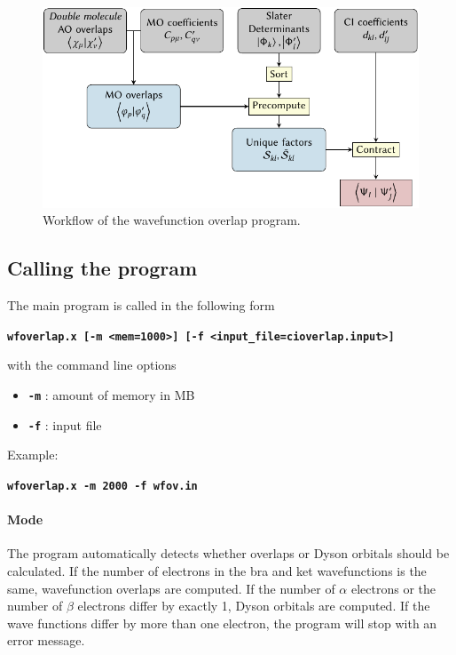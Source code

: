 \documentclass[a4paper,10pt,DIV=15,openany,twoside=false]{scrbook}
\newcommand{\ttt}[1]{\textbf{\texttt{#1}}}
\newenvironment{example}{
  \setlength{\OuterFrameSep}{3pt}
  \vspace{0mm}
  \definecolor{shadecolor}{HTML}{E4F4FF}
  \begin{shaded}
}{
  \end{shaded}
}
\begin{document}
\begin{figure}[htb]
  \centering
  \includegraphics[scale=1]{img/wfoverlap/wfoverlap.pdf}
  \caption{Workflow of the wavefunction overlap program.}
  \label{fig:work}
\end{figure}



\subsection{Calling the program}
The main program is called in the following form
%
\begin{example}
\ttt{wfoverlap.x [-m <mem=1000>] [-f <input\_file=cioverlap.input>]}
\end{example}
%
with the command line options
%
\begin{itemize}
\item \ttt{-m} : amount of memory in MB
\item \ttt{-f} : input file
\end{itemize}

Example:
\begin{example}
\ttt{wfoverlap.x -m 2000 -f wfov.in}
\end{example}

\paragraph{Mode}

The program automatically detects whether overlaps or Dyson orbitals should be calculated.
If the number of electrons in the bra and ket wavefunctions is the same, wavefunction overlaps are computed.
If the number of $\alpha$ electrons or the number of $\beta$ electrons differ by exactly 1, Dyson orbitals are computed.
If the wave functions differ by more than one electron, the program will stop with an error message.
\end{document}
